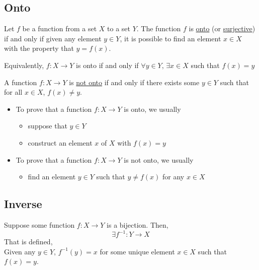 \subsection{Onto}
\begin{definition}
    Let $f$ be a function from a set $X$ to a set $Y$. The function $f$ is \underline{onto} (or \underline{surjective}) if and only if given any element $y\in Y$, it is possible to find an element $x\in X$ with the property that $y = f(x)$.

    Equivalently, $f:X\rightarrow Y$ is onto if and only if $\forall y\in Y,\,\exists x\in X$ such that $f(x) = y$

    A function $f:X\rightarrow Y$ is \underline{not onto} if and only if there exists some $y\in Y$ such that for all $x\in X$, $f(x)\neq y$.
\end{definition}

\begin{itemize}
    \item To prove that a function $f: X\rightarrow Y$ is onto, we usually \begin{itemize}
        \item suppose that $y\in Y$
        \item construct an element $x$ of $X$ with $f(x) = y$
    \end{itemize}
    \item To prove that a function $f: X\rightarrow Y$ is not onto, we usually \begin{itemize}
        \item find an element $y\in Y$ such that $y \neq f(x)$ for any $x\in X$
    \end{itemize}
\end{itemize}

\newpage
\subsection{Inverse}
\begin{theorm}
    Suppose some function \(f: X\to Y\) is a bijection. Then, \[\exists f^{-1}: Y\to X\]
    That is defined,\\
    Given any \(y\in Y\), \(f^{-1}(y) = x\) for some unique element \(x\in X\) such that \(f(x) = y\). 
\end{theorm}
